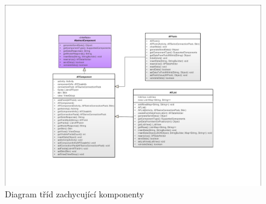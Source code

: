 \begin{figure}
\begin{center}
\includegraphics[width=\textwidth, keepaspectratio, angle=270]{figures/classDiagramComponents}
\caption{Diagram tříd zachycující komponenty}
\label{img:classDiagramComponents}
\end{center}
\end{figure}

